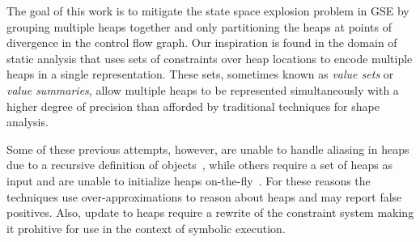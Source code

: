
The goal of this work is to mitigate the state space explosion problem
in GSE by grouping multiple heaps together and only partitioning the
heaps at points of divergence in the control flow graph. Our
inspiration is found in the domain of static analysis that uses sets
of constraints over heap locations to encode multiple heaps in a
single representation. These sets, sometimes known as \emph{value sets} or
\emph{value summaries}, allow multiple heaps to be represented simultaneously
with a higher degree of precision than afforded by traditional
techniques for shape analysis.

Some of these
previous attempts, however, are unable to handle aliasing in heaps due
to a recursive definition of objects~\cite{..}, while others require a
set of heaps as input and are unable to initialize heaps
on-the-fly~\cite{..}. For these reasons the techniques use
over-approximations to reason about heaps and may report false
positives. Also, update to heaps require a rewrite of the constraint
system making it prohitive for use in the context of symbolic
execution.

\begin{comment}
Unfortunately, value sets often do not support aliasing and require a
recursive definition of objects~\cite{..}. Also, heap updates often
require that the path constraint be rewritten to reflect the update,
and the constraints in the value set may also need to be rewritten with the
addition of auxiliary variables. These non-local operations make it
difficult to use value sets in symbolic execution. As is
typical in static analysis, over approximation of the value sets
alleviates some of the limitations but also leads to false positives.
\end{comment}




